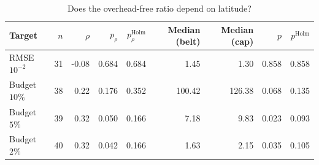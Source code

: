 \begin{table}[t]
\centering
\caption{Does the overhead-free ratio depend on latitude?}
\label{tab:latitude_effect}
\footnotesize
\begin{tabular}{lrrrrrrrr}
\toprule
Target & $n$ & $\rho$ & $p_\rho$ & $p_\rho^{\mathrm{Holm}}$ & Median (belt) & Median (cap) & $p$ & $p^{\mathrm{Holm}}$ \\
\midrule
RMSE $10^{-2}$ & 31 & -0.08 & 0.684 & 0.684 & 1.45 & 1.30 & 0.858 & 0.858 \\
Budget $10\%$ & 38 & 0.22 & 0.176 & 0.352 & 100.42 & 126.38 & 0.068 & 0.135 \\
Budget $5\%$ & 39 & 0.32 & 0.050 & 0.166 & 7.18 & 9.83 & 0.023 & 0.093 \\
Budget $2\%$ & 40 & 0.32 & 0.042 & 0.166 & 1.63 & 2.15 & 0.035 & 0.105 \\
\bottomrule
\end{tabular}
\end{table}
